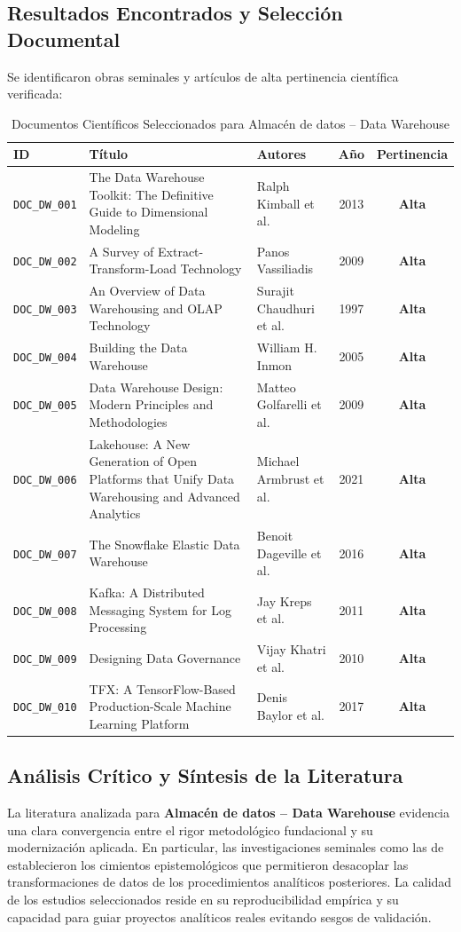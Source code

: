 \subsection{Resultados Encontrados y Selección Documental}
Se identificaron obras seminales y artículos de alta pertinencia científica verificada:
\begin{table}[H]
\centering
\scriptsize
\caption{Documentos Científicos Seleccionados para Almacén de datos – Data Warehouse}
\begin{tabular}{p{1.8cm}p{4.5cm}p{3.2cm}cc}
\toprule
\textbf{ID} & \textbf{Título} & \textbf{Autores} & \textbf{Año} & \textbf{Pertinencia} \\
\midrule
\texttt{DOC_DW_001} & The Data Warehouse Toolkit: The Definitive Guide to Dimensional Modeling & Ralph Kimball et al. & 2013 & \textbf{Alta} \\
\texttt{DOC_DW_002} & A Survey of Extract-Transform-Load Technology & Panos Vassiliadis & 2009 & \textbf{Alta} \\
\texttt{DOC_DW_003} & An Overview of Data Warehousing and OLAP Technology & Surajit Chaudhuri et al. & 1997 & \textbf{Alta} \\
\texttt{DOC_DW_004} & Building the Data Warehouse & William H. Inmon & 2005 & \textbf{Alta} \\
\texttt{DOC_DW_005} & Data Warehouse Design: Modern Principles and Methodologies & Matteo Golfarelli et al. & 2009 & \textbf{Alta} \\
\texttt{DOC_DW_006} & Lakehouse: A New Generation of Open Platforms that Unify Data Warehousing and Advanced Analytics & Michael Armbrust et al. & 2021 & \textbf{Alta} \\
\texttt{DOC_DW_007} & The Snowflake Elastic Data Warehouse & Benoit Dageville et al. & 2016 & \textbf{Alta} \\
\texttt{DOC_DW_008} & Kafka: A Distributed Messaging System for Log Processing & Jay Kreps et al. & 2011 & \textbf{Alta} \\
\texttt{DOC_DW_009} & Designing Data Governance & Vijay Khatri et al. & 2010 & \textbf{Alta} \\
\texttt{DOC_DW_010} & TFX: A TensorFlow-Based Production-Scale Machine Learning Platform & Denis Baylor et al. & 2017 & \textbf{Alta} \\
\bottomrule
\end{tabular}
\end{table}


\subsection{Análisis Crítico y Síntesis de la Literatura}
La literatura analizada para \textbf{Almacén de datos – Data Warehouse} evidencia una clara convergencia entre el rigor metodológico fundacional y su modernización aplicada. 
En particular, las investigaciones seminales como las de \citeauthor{ralph} establecieron los cimientos epistemológicos que permitieron desacoplar las transformaciones de datos de los procedimientos analíticos posteriores. 
La calidad de los estudios seleccionados reside en su reproducibilidad empírica y su capacidad para guiar proyectos analíticos reales evitando sesgos de validación.


